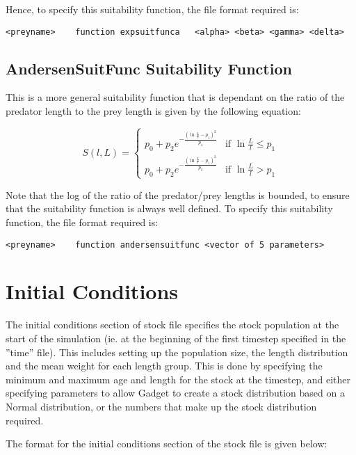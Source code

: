 \documentclass [a4paper, 10pt]{book}
\begin{document}
\bigskip
Hence, to specify this suitability function, the file format required is:

{\small\begin{verbatim}
<preyname>    function expsuitfunca   <alpha> <beta> <gamma> <delta>
\end{verbatim}}

\subsection{AndersenSuitFunc Suitability Function}
This is a more general suitability function that is dependant on the ratio of the predator length to the prey length is given by the following equation:

\begin{equation}\label{eq:andersensuit}
S(l, L) =
\begin{cases}
p_0 + p_2e^{-\frac{(\ln\frac{L}{l} - p_1)^2}{p_4}} & \textrm{if $\ln\frac{L}{l} \leq p_1$} \\
p_0 + p_2e^{-\frac{(\ln\frac{L}{l} - p_1)^2}{p_3}} & \textrm{if $\ln\frac{L}{l} > p_1$}
\end{cases}
\end{equation}

\bigskip
Note that the log of the ratio of the predator/prey lengths is bounded, to ensure that the suitability function is always well defined.  To specify this suitability function, the file format required is:

{\small\begin{verbatim}
<preyname>    function andersensuitfunc <vector of 5 parameters>
\end{verbatim}}

\section{Initial Conditions}\label{sec:stockinitial}
The initial conditions section of stock file specifies the stock population at the start of the simulation (ie. at the beginning of the first timestep specified in the ''time'' file).  This includes setting up the population size, the length distribution and the mean weight for each length group.  This is done by specifying the minimum and maximum age and length for the stock at the timestep, and either specifying parameters to allow Gadget to create a stock distribution based on a Normal distribution, or the numbers that make up the stock distribution required.

\bigskip
The format for the initial conditions section of the stock file is given below:
\end{document}
